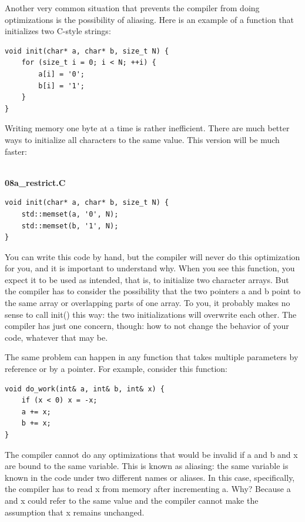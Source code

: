 Another very common situation that prevents the compiler from doing optimizations is the possibility of aliasing. Here is an example of a function that initializes two C-style strings:

\begin{lstlisting}[style=styleCXX]
void init(char* a, char* b, size_t N) {
	for (size_t i = 0; i < N; ++i) {
		a[i] = '0';
		b[i] = '1';
	}
}

\end{lstlisting}

Writing memory one byte at a time is rather inefficient. There are much better ways to initialize all characters to the same value. This version will be much faster:

\hspace*{\fill} \\ %
\noindent
\textbf{08a\_restrict.C}
\begin{lstlisting}[style=styleCXX]
void init(char* a, char* b, size_t N) {
	std::memset(a, '0', N);
	std::memset(b, '1', N);
}
\end{lstlisting}

You can write this code by hand, but the compiler will never do this optimization for you, and it is important to understand why. When you see this function, you expect it to be used as intended, that is, to initialize two character arrays. But the compiler has to consider the possibility that the two pointers a and b point to the same array or overlapping parts of one array. To you, it probably makes no sense to call init() this way: the two initializations will overwrite each other. The compiler has just one concern, though: how to not change the behavior of your code, whatever that may be. 

The same problem can happen in any function that takes multiple parameters by reference or by a pointer. For example, consider this function:

\begin{lstlisting}[style=styleCXX]
void do_work(int& a, int& b, int& x) {
	if (x < 0) x = -x;
	a += x;
	b += x;
}
\end{lstlisting}

The compiler cannot do any optimizations that would be invalid if a and b and x are bound to the same variable. This is known as aliasing: the same variable is known in the code under two different names or aliases. In this case, specifically, the compiler has to read x from memory after incrementing a. Why? Because a and x could refer to the same value and the compiler cannot make the assumption that x remains unchanged.

